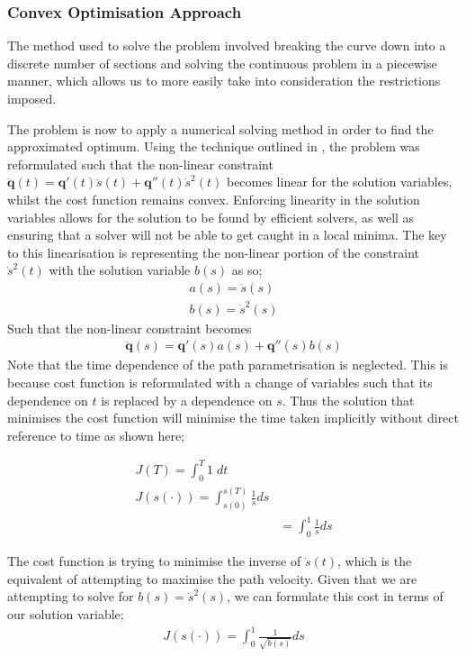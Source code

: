 \subsubsection{Convex Optimisation Approach}
The method used to solve the problem involved breaking the curve down into a discrete number of sections and solving the continuous problem in a piecewise manner, which allows us to more easily take into consideration the restrictions imposed.

The problem is now to apply a numerical solving method in order to find the approximated optimum. Using the technique outlined in \cite{Schutter09}, the problem was reformulated such that the non-linear constraint $\ddot{\textbf{q}}(t) = \textbf{q}'(t)\ddot{s}(t) + \textbf{q}''(t)\dot{s}^2(t)$ becomes linear for the solution variables, whilst the cost function remains convex. Enforcing linearity in the solution variables allows for the solution to be found by efficient solvers, as well as ensuring that a solver will not be able to get caught in a local minima.
The key to this linearisation is representing the non-linear portion of the constraint $\dot{s}^2(t)$ with the solution variable $b(s)$ as so;
\begin{align*}
a(s) = \ddot{s}(s)\\
b(s) = \dot{s}^2(s)
\end{align*}
Such that the non-linear constraint becomes
\begin{align*}
\ddot{\textbf{q}}(s) = \textbf{q}'(s)a(s) + \textbf{q}''(s)b(s)
\end{align*}
Note that the time dependence of the path parametrisation is neglected. This is because cost function is reformulated with a change of variables such that its dependence on $t$ is replaced by a dependence on $s$. Thus the solution that minimises the cost function will minimise the time taken implicitly without direct reference to time as shown here;

\begin{align*}
J(T) = \int_0^T1\;dt\\
J(s(\cdot)) = \int_{s(0)}^{s(T)} \frac{1}{\dot{s}}ds\\
	&= \int_0^1\frac{1}{\dot{s}}ds
\end{align*}

The cost function is trying to minimise the inverse of $\dot{s}(t)$, which is the equivalent of attempting to maximise the path velocity. Given that we are attempting to solve for $b(s) = \dot{s}^2(s)$, we can formulate this cost in terms of our solution variable;
\begin{align*}
J(s(\cdot)) = \int_0^1\frac{1}{\sqrt{b(s)}}ds
\end{align*}

